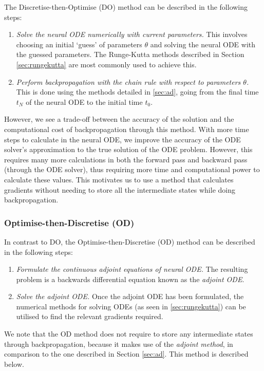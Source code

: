 \documentclass[a4paper,11pt,titlepage]{article}
\theoremstyle{definition}
\theoremstyle{plain}
\theoremstyle{remark}
\begin{document}
The Discretise-then-Optimise (DO) method can be described in the following steps:
\begin{enumerate}
    \item \textit{Solve the neural ODE numerically with current parameters.} This involves choosing an initial ‘guess’ of parameters $\theta$ and solving the neural ODE with the guessed parameters. The Runge-Kutta methods described in Section \ref{sec:rungekutta} are most commonly used to achieve this.
    \item \textit{Perform backpropagation with the chain rule with respect to parameters $\theta$.} This is done using the methods detailed in \ref{sec:ad}, going from the final time $t_N$ of the neural ODE to the initial time $t_0$.
\end{enumerate}

However, we see a trade-off between the accuracy of the solution and the computational cost of backpropagation through this method. With more time steps to calculate in the neural ODE, we improve the accuracy of the ODE solver's approximation to the true solution of the ODE problem. However, this requires many more calculations in both the forward pass and backward pass (through the ODE solver), thus requiring more time and computational power to calculate these values. This motivates us to use a method that calculates gradients without needing to store all the intermediate states while doing backpropagation.

\subsubsection{Optimise-then-Discretise (OD)}
\label{sec:od}

In contrast to DO, the Optimise-then-Discretise (OD) method can be described in the following steps:
\begin{enumerate}
    \item \textit{Formulate the continuous adjoint equations of neural ODE.} The resulting problem is a backwards differential equation known as the \textit{adjoint ODE}.
    \item \textit{Solve the adjoint ODE.} Once the adjoint ODE has been formulated, the numerical methods for solving ODEs (as seen in \ref{sec:rungekutta}) can be utilised to find the relevant gradients required.
\end{enumerate}

We note that the OD method does not require to store any intermediate states through backpropagation, because it makes use of the \textit{adjoint method}, in comparison to the one described in Section \ref{sec:ad}. This method is described below.
\end{document}
